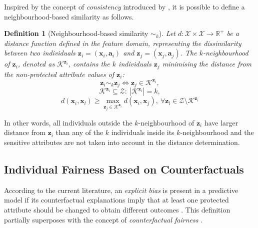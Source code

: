 \documentclass[letterpaper]{article} %
\newtheorem{definition}{Definition}
\begin{document}
Inspired by the concept of \emph{consistency} introduced by \cite{ZemelWSPD13}, it is possible to define a neighbourhood-based similarity as follows.
%
\begin{definition}[Neighbourhood-based similarity $\sim_k$]\label{similar_individuals_neigh}
	Let $d: \mathcal{X} \times \mathcal{X} \rightarrow \mathbb{R}^{+}$ be a distance function defined in the feature domain, representing the dissimilarity between two individuals $\boldsymbol{z}_i = (\boldsymbol{x}_i, \boldsymbol{a}_i)$ and $\boldsymbol{z}_j = (\boldsymbol{x}_j, \boldsymbol{a}_j)$.
	The $k$-neighbourhood of $\boldsymbol{z}_i$, denoted as $\mathcal{K}^{\boldsymbol{z}_i}$, contains the $k$ individuals $\boldsymbol{z}_j$ minimising the distance from the non-protected attribute values of $\boldsymbol{z}_i$:
	$$ \boldsymbol{z}_i \sim_k \boldsymbol{z}_j \iff \boldsymbol{z}_j \in \mathcal{K}^{\boldsymbol{z}_i}, $$
	$$\mathcal{K}^{\boldsymbol{z}_i} \subseteq \mathcal{Z} : ~ | \mathcal{K}^{\boldsymbol{z}_i} | = k,$$
	$$d(\boldsymbol{x}_i, \boldsymbol{x}_l) \geq \underset{\boldsymbol{z}_j \in \mathcal{K}^{\boldsymbol{z}_i}}{\max} d(\boldsymbol{x}_i, \boldsymbol{x}_j), ~ \forall \boldsymbol{z}_l \in \mathcal{Z} \setminus \mathcal{K}^{\boldsymbol{z}_i}$$ %
\end{definition}
%
\noindent In other words, all individuals outside the $k$-neighbourhood of $\boldsymbol{z}_i$ have larger distance from $\boldsymbol{z}_i$ than any of the $k$ individuals inside its $k$-neighbourhood and the sensitive attributes are not taken into account in the distance determination.

\subsection{Individual Fairness Based on Counterfactuals}

According to the current literature, an \emph{explicit bias} is present in a predictive model if its counterfactual explanations imply that at least one protected attribute should be changed to obtain different outcomes \cite{sokol2022fat}. This definition partially superposes with the concept of \emph{counterfactual fairness} \cite{NIPS2017_a486cd07}.
\end{document}
